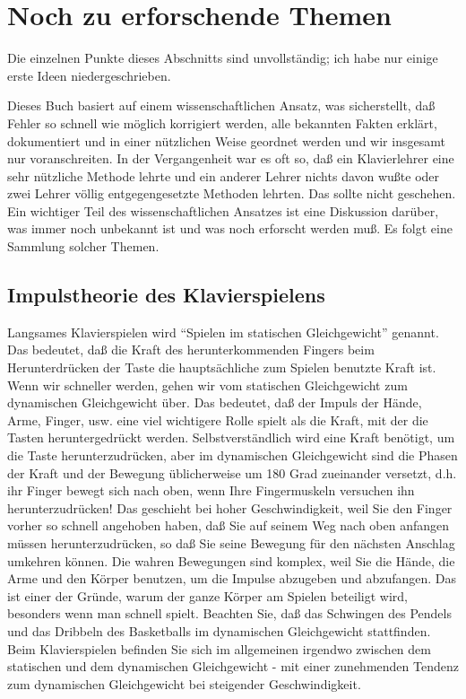 
\section{Noch zu erforschende Themen}
\label{c1iv6}

Die einzelnen Punkte dieses Abschnitts sind unvollständig; ich habe nur einige erste Ideen niedergeschrieben.

Dieses Buch basiert auf einem wissenschaftlichen Ansatz, was sicherstellt, daß Fehler so schnell wie möglich korrigiert werden, alle bekannten Fakten erklärt, dokumentiert und in einer nützlichen Weise geordnet werden und wir insgesamt nur voranschreiten.
In der Vergangenheit war es oft so, daß ein Klavierlehrer eine sehr nützliche Methode lehrte und ein anderer Lehrer nichts davon wußte oder zwei Lehrer völlig entgegengesetzte Methoden lehrten.
Das sollte nicht geschehen.
Ein wichtiger Teil des wissenschaftlichen Ansatzes ist eine Diskussion darüber, was immer noch unbekannt ist und was noch erforscht werden muß.
Es folgt eine Sammlung solcher Themen.


\subsection{Impulstheorie des Klavierspielens}
\label{c1iv6a}

Langsames Klavierspielen wird \enquote{Spielen im statischen Gleichgewicht} genannt.
Das bedeutet, daß die Kraft des herunterkommenden Fingers beim Herunterdrücken der Taste die hauptsächliche zum Spielen benutzte Kraft ist.
Wenn wir schneller werden, gehen wir vom statischen Gleichgewicht zum dynamischen Gleichgewicht über.
Das bedeutet, daß der Impuls der Hände, Arme, Finger, usw. eine viel wichtigere Rolle spielt als die Kraft, mit der die Tasten heruntergedrückt werden.
Selbstverständlich wird eine Kraft benötigt, um die Taste herunterzudrücken, aber im dynamischen Gleichgewicht sind die Phasen der Kraft und der Bewegung üblicherweise um 180  Grad zueinander versetzt, d.h. ihr Finger bewegt sich nach oben, wenn Ihre Fingermuskeln versuchen ihn herunterzudrücken!
Das geschieht bei hoher Geschwindigkeit, weil Sie den Finger vorher so schnell angehoben haben, daß Sie auf seinem Weg nach oben anfangen müssen herunterzudrücken, so daß Sie seine Bewegung für den nächsten Anschlag umkehren können.
Die wahren Bewegungen sind komplex, weil Sie die Hände, die Arme und den Körper benutzen, um die Impulse abzugeben und abzufangen.
Das ist einer der Gründe, warum der ganze Körper am Spielen beteiligt wird, besonders wenn man schnell spielt.
Beachten Sie, daß das Schwingen des Pendels und das Dribbeln des Basketballs im dynamischen Gleichgewicht stattfinden.
Beim Klavierspielen befinden Sie sich im allgemeinen irgendwo zwischen dem statischen und dem dynamischen Gleichgewicht - mit einer zunehmenden Tendenz zum dynamischen Gleichgewicht bei steigender Geschwindigkeit.


